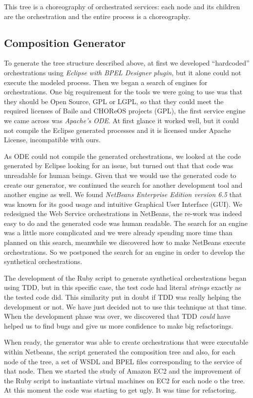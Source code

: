 This tree is a choreography of orchestrated services: each node and its children are the orchestration and the entire process is a choreography.

\subsection{Composition Generator}
To generate the tree structure described above, at first we developed ``hardcoded'' orchestrations using \emph{Eclipse with BPEL Designer plugin}, but it alone could not execute the modeled process. Then we began a search of engines for orchestrations. One big requirement for the tools we were going to use was that they should be Open Source, GPL or LGPL, so that they could meet the required licenses of Baile and CHOReOS projects (GPL), the first service engine we came across was \emph{Apache's ODE}. At first glance it worked well, but it could not compile the Eclipse generated processes and it is licensed under Apache License, incompatible with ours.

As ODE could not compile the generated orchestrations, we looked at the code generated by Eclipse looking for an issue, but turned out that that code was unreadable for human beings. Given that we would use the generated code to create our generator, we continued the search for another development tool and another engine as well. We found \emph{NetBeans Enterprise Edition version 6.5} that was known for its good usage and intuitive Graphical User Interface (GUI). We redesigned the Web Service orchestrations in NetBeans, the re-work was indeed easy to do and the generated code was human readable. The search for an engine was a little more complicated and we were already spending more time than planned on this search, meanwhile we discovered how to make NetBeans execute orchestrations. So we postponed the search for an engine in order to develop the synthetical orchestrations.

The development of the Ruby script to generate synthetical orchestrations began using TDD, but in this specific case, the test code had literal \emph{strings} exactly as the tested code did. This similarity put in doubt if TDD was really helping the development or not. We have just decided not to use this technique at that time. When the development phase was over, we discovered that TDD \emph{could} have helped us to find bugs and give us more confidence to make big refactorings.

When ready, the generator was able to create orchestrations that were executable within Netbeans, the script generated the composition tree and also, for each node of the tree, a set of WSDL and BPEL files corresponding to the service of that node. Then we started the study of Amazon EC2 and the improvement of the Ruby script to instantiate virtual machines on EC2 for each node o the tree. At this moment the code was starting to get ugly. It was time for refactoring.

